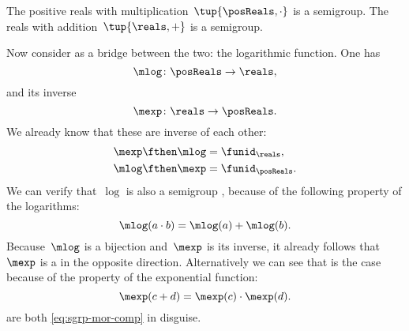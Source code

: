 \begin{example}
    The positive reals with multiplication~$\tup{\posReals, \cdot}$ is a semigroup.
    The reals with addition~$\tup{\reals, +}$ is a semigroup.

    Now consider as a bridge between the two: the logarithmic function.
    One has
    \begin{equation*}
        \label{eq:log}
        \mlog \colon  \posReals \to \reals,
    \end{equation*}
    and its inverse
    \begin{equation*}
        \label{eq:exp}
        \mexp \colon  \reals \to \posReals.
    \end{equation*}
    We already know that these are inverse of each other:
    \begin{equation*}
        \label{eq:exp-log-are-inverses}
        \begin{aligned}
            \mexp \fthen \mlog & = \funid_{\reals}, \\
            \mlog \fthen \mexp & = \funid_{\posReals}.
        \end{aligned}
    \end{equation*}
    We can verify that~$\log$ is also a semigroup \whomo, because of the following property of the logarithms:
    \begin{equation}
        \label{eq:log-property}
        \mlog(a \cdot b) = \mlog(a) + \mlog(b).
    \end{equation}
    Because~$\mlog$ is a bijection and~$\mexp$ is its inverse, it already follows that~$\mexp$ is a \whomo in the opposite direction.
    Alternatively we can see that is the case because of the property of the exponential function:
    \begin{equation}
        \label{eq:exp-property}
        \mexp(c + d) = \mexp(c) \cdot \mexp(d).
    \end{equation}
     are both \cref{eq:sgrp-mor-comp} in disguise.
\end{example}

